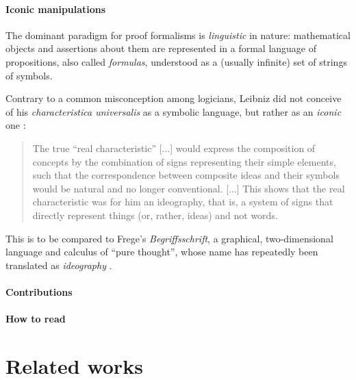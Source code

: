 \paragraph{Iconic manipulations}

The dominant paradigm for proof formalisms is \emph{linguistic} in nature:
mathematical objects and assertions about them are represented in a formal
language of propositions, also called \emph{formulas}, understood as a (usually
infinite) set of strings of symbols.

Contrary to a common misconception among logicians, Leibniz did not conceive of
his \textit{characteristica universalis} as a symbolic language, but rather as
an \emph{iconic} one \cite[Chpt.~3]{logique_leibniz}:
\begin{quote}
    The true ``real characteristic'' [...] would express the composition of
    concepts by the combination of signs representing their simple elements,
    such that the correspondence between composite ideas and their symbols would
    be natural and no longer conventional. [...] This shows that the real
    characteristic was for him an ideography, that is, a system of signs that
    directly represent things (or, rather, ideas) and not words.
\end{quote}
This is to be compared to Frege's \textit{Begriffsschrift}, a graphical,
two-dimensional language and calculus of ``pure thought'', whose name has
repeatedly been translated as \emph{ideography}
.

\paragraph{Contributions}

\paragraph{How to read}



\section{Related works}

